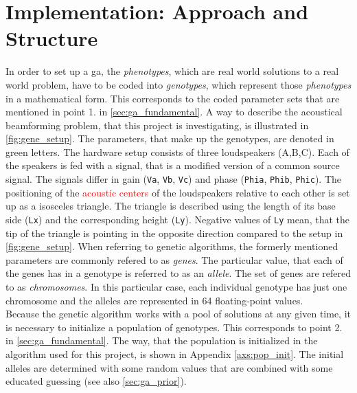 \section{Implementation: Approach and Structure}\label{sec:genetic_implememtation}
In order to set up a \gls{ga}, the \textit{phenotypes}, which are real world solutions to a real world problem, have to be coded into \textit{genotypes}, which represent those \textit{phenotypes} in a mathematical form. This corresponds to the coded parameter sets that are mentioned in point 1. in \autoref{sec:ga_fundamental}.
A way to describe the acoustical beamforming problem, that this project is investigating, is illustrated in \autoref{fig:gene_setup}. The parameters, that make up the genotypes, are denoted in \textcolor{green3}{green} letters. The hardware setup consists of three loudspeakers (A,B,C). Each of the speakers is fed with a signal, that is a modified version of a common source signal. The signals differ in gain (\textcolor{green3}{\texttt{Va}}, \textcolor{green3}{\texttt{Vb}}, \textcolor{green3}{\texttt{Vc}}) and phase (\textcolor{green3}{\texttt{Phia}}, \textcolor{green3}{\texttt{Phib}}, \textcolor{green3}{\texttt{Phic}}). The positioning of the \textcolor{red}{acoustic centers} of the loudspeakers relative to each other is set up as a isosceles triangle. The triangle is described using the length of its base side (\textcolor{green3}{\texttt{Lx}}) and the corresponding height (\textcolor{green3}{\texttt{Ly}}). Negative values of \textcolor{green3}{\texttt{Ly}} mean, that the tip of the triangle is pointing in the opposite direction compared to the setup in \autoref{fig:gene_setup}. When referring to genetic algorithms, the formerly mentioned parameters are commonly refered to as \textit{genes}. The particular value, that each of the genes has in a genotype is referred to as an \textit{allele}. The set of genes are refered to as \textit{chromosomes}. In this particular case, each individual genotype has just one chromosome and the alleles are represented in \SI{64}{\bit} floating-point values.\\
Because the genetic algorithm works with a pool of solutions at any given time, it is necessary to initialize a population of genotypes. This corresponds to point 2. in \autoref{sec:ga_fundamental}. The way, that the population is initialized in the algorithm used for this project, is shown in Appendix \ref{axs:pop_init}. The initial alleles are determined with some random values that are combined with some educated guessing (see also \autoref{sec:ga_prior}).\\
